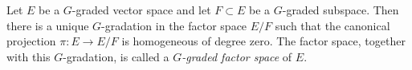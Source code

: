 Let $E$ be a $G$-graded vector space and let $F \subset E$ be a $G$-graded subspace. Then there is a unique $G$-gradation in the factor space $E/F$ such that the canonical projection $\pi: E \rightarrow E/F$ is homogeneous of degree zero. The factor space, together with this $G$-gradation, is called a \textit{$G$-graded factor space} of $E$.
